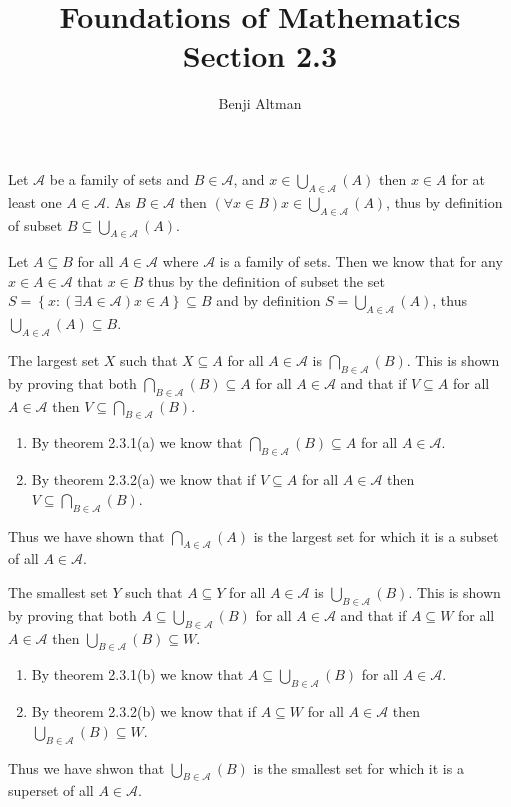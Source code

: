 \documentclass{article}
\title{Foundations of Mathematics \\ Section 2.3}
\author{Benji Altman}
\let\bigunion\bigcup
\let\biginter\bigcap
\newcommand{\interacross}[2]{\biginter\limits_{#1} \left( {#2} \right)}
\newcommand{\unionacross}[2]{\bigunion\limits_{#1} \left( {#2} \right)}
\newcommand{\set}[1]{\left\{ {#1} \right\}}
\begin{document}
\maketitle

Let $\mathscr A$ be a family of sets and $B \in \mathscr A$, and $x \in \unionacross{A \in \mathscr A}{A}$ then $x \in A$ for at least one $A \in \mathscr A$. As $B \in \mathscr A$ then $\left(\forall x \in B\right) x\in\unionacross{A \in \mathscr A}{A}$, thus by definition of subset $B \subseteq \unionacross{A \in \mathscr A}A$.
\medskip

Let $A \subseteq B$ for all $A \in \mathscr A$ where $\mathscr A$ is a family of sets. Then we know that for any $x \in A \in \mathscr A$ that $x \in B$ thus by the definition of subset the set $S = \set{x : (\exists A \in \mathscr A) x \in A} \subseteq B$ and by definition $S = \unionacross{A \in \mathscr A}{A}$, thus $\unionacross{A \in \mathscr A}{A} \subseteq B$.
\bigskip

The largest set $X$ such that $X\subseteq A$ for all $A\in\mathscr A$ is $\interacross{B\in\mathscr A}B$. This is shown by proving that both $\interacross{B\in\mathscr A}B \subseteq A$ for all $A\in \mathscr A$ and that if $V \subseteq A$ for all $A \in \mathscr A$ then $V \subseteq \interacross{B\in\mathscr A}B$.
\begin{enumerate}
\item By theorem 2.3.1(a) we know that $\interacross{B\in\mathscr A}B \subseteq A$ for all $A\in \mathscr A$.
\item By theorem 2.3.2(a) we know that  if $V \subseteq A$ for all $A \in \mathscr A$ then $V \subseteq \interacross{B\in\mathscr A}B$.
\end{enumerate}
Thus we have shown that $\interacross{A\in\mathscr A}A$ is the largest set for which it is a subset of all $A \in \mathscr A$.
\medskip

The smallest set $Y$ such that $A \subseteq Y$ for all $A \in \mathscr A$ is $\unionacross{B\in\mathscr A}B$. This is shown by proving that both $A \subseteq \unionacross{B\in\mathscr A}B$ for all $A \in \mathscr A$ and that if $A \subseteq W$ for all $A \in \mathscr A$ then $\unionacross{B\in\mathscr A}B \subseteq W$.
\begin{enumerate}
\item By theorem 2.3.1(b) we know that $A \subseteq \unionacross{B\in\mathscr A}B$ for all $A \in \mathscr A$.
\item By theorem 2.3.2(b) we know that  if $A \subseteq W$ for all $A \in \mathscr A$ then $\unionacross{B\in\mathscr A}B \subseteq W$.
\end{enumerate}
Thus we have shwon that $\unionacross{B\in\mathscr A}B$ is the smallest set for which it is a superset of all $A \in \mathscr A$.
\bigskip
\end{document}
